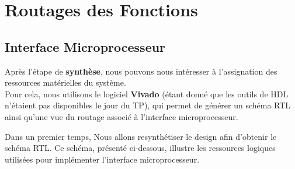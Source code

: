 \section{Routages des Fonctions
}
\subsection{Interface Microprocesseur}

Après l'étape de \textbf{synthèse}, nous pouvons nous intéresser à l'assignation des ressources 
matérielles du système.\\
Pour cela, nous utilisons le logiciel \textbf{Vivado} (étant donné que les outils de HDL n'étaient 
pas disponibles le jour du TP), qui permet de générer un schéma RTL ainsi qu'une vue du routage 
associé à l'interface microprocesseur.
\newline

Dans un premier temps, Nous allons resynthétiser le design afin d'obtenir le schéma RTL.
Ce schéma, présenté ci-dessous, illustre les ressources logiques utilisées pour implémenter 
l'interface microprocesseur.
\newline


